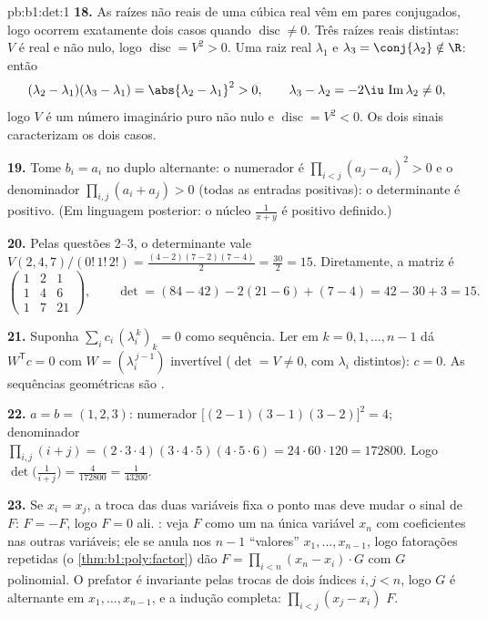 \begin{solution}{pb:b1:det:1}
\textbf{18.} As raízes não reais de uma cúbica real vêm em pares
conjugados, logo ocorrem exatamente dois casos quando $\operatorname{disc} \neq
0$. Três
raízes reais distintas: $V$ é real e não nulo, logo $\operatorname{disc} = V^2 > 0$. Uma raiz
real $\lambda_1$ e $\lambda_3 = \conj{\lambda_2} \notin \R$: então
\[
(\lambda_2 - \lambda_1)(\lambda_3 - \lambda_1) =
\abs{\lambda_2 - \lambda_1}^2 > 0,
\qquad
\lambda_3 - \lambda_2 = -2\iu\,\operatorname{Im}\lambda_2 \neq 0,
\]
logo $V$ é um número imaginário puro não nulo e $\operatorname{disc} = V^2 < 0$. Os dois
sinais caracterizam os dois casos.

\textbf{19.} Tome $b_i = a_i$ no duplo alternante: o numerador é $\prod_{i<j}(a_j - a_i)^2 > 0$ e o
denominador $\prod_{i,j}(a_i + a_j) > 0$ (todas as entradas positivas): o determinante é
positivo. (Em linguagem posterior: o núcleo $\frac1{x+y}$ é positivo
definido.)

\textbf{20.} Pelas questões 2--3, o determinante vale $V(2,4,7)/(0!\,1!\,2!) = \frac{(4-2)(7-2)(7-4)}{2} =
\frac{30}{2} = 15$.
Diretamente, a matriz é
\[
\begin{pmatrix}
1 & 2 & 1\\
1 & 4 & 6\\
1 & 7 & 21
\end{pmatrix},
\qquad
\det = (84 - 42) - 2(21 - 6) + (7 - 4) = 42 - 30 + 3 = 15 .
\]

\textbf{21.} Suponha $\sum_i c_i\,(\lambda_i^{\,k})_{k} = 0$ como sequência. Ler em $k = 0, 1, \dots, n-1$ dá $W^{\mathsf
T}c = 0$ com
$W = (\lambda_i^{\,j-1})$ invertível ($\det = V
\neq 0$, com $\lambda_i$ distintos): $c = 0$. As
sequências geométricas são .

\textbf{22.} $a = b = (1, 2, 3)$: numerador $\bigl[(2-1)(3-1)
(3-2)\bigr]^2 = 4$; denominador $\prod_{i,j}(i + j) =
(2\cdot3\cdot4)(3\cdot4\cdot5)(4\cdot5\cdot6) = 24\cdot60\cdot120
= 172800$. Logo $\det\bigl(\frac1{i+j}\bigr) = \frac{4}{172800}
= \frac1{43200}$.

\textbf{23.} Se $x_i = x_j$, a troca das duas variáveis fixa o ponto mas
deve mudar o sinal de $F$: $F = -F$, logo $F = 0$ ali.
: veja $F$ como um  na única variável $x_n$
com coeficientes nas outras variáveis; ele se anula nos $n - 1$
``valores'' $x_1, \dots, x_{n-1}$, logo fatorações repetidas (o \cref{thm:b1:poly:factor}) dão $F =
\prod_{i<n}(x_n - x_i)\cdot G$ com
$G$ polinomial. O prefator é invariante pelas trocas de dois índices
$i, j < n$, logo $G$ é alternante em $x_1, \dots, x_{n-1}$, e a indução completa: $\prod_{i<j}(x_j - x_i)$
 $F$.


\end{solution}
